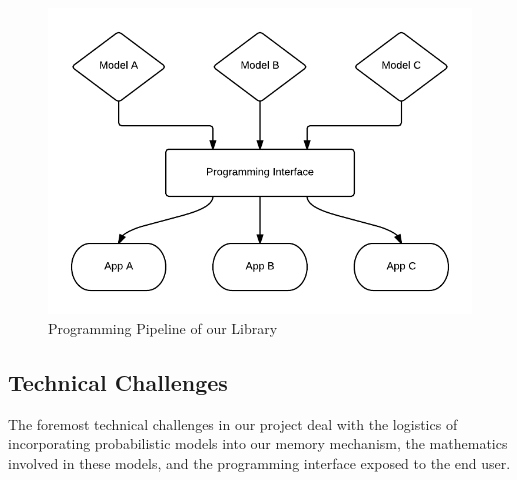 \documentclass{sig-alternate}
\begin{document}
\begin{figure}[H]
	\begin{center}
		\includegraphics[width=1\linewidth]{block2}
	\end{center}
	\vspace{-12pt}
	\caption{Programming Pipeline of our Library}
	\label{fig:block2}
\end{figure}

%

\subsection{Technical Challenges}
\label{subsec:tech_challenges}
The foremost technical challenges in our project deal with the logistics of incorporating
probabilistic models into our memory mechanism, the mathematics involved in these models,
and the programming interface exposed to the end user.
\end{document}
